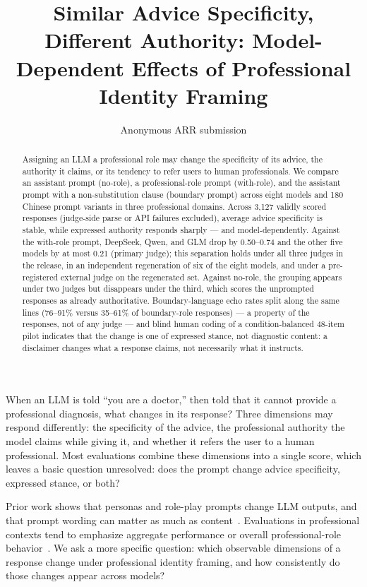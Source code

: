 \documentclass[11pt]{article}
\title{Similar Advice Specificity, Different Authority: Model-Dependent Effects of Professional Identity Framing}
\author{Anonymous ARR submission}
\makeatletter
\renewcommand\section{\@startsection{section}{1}{\z@}{-1.6ex plus -0.5ex minus -.2ex}{1.2ex plus 0.3ex minus .2ex}{\large\bfseries\raggedright}}
\makeatother
\begin{document}
\maketitle

\begin{abstract}
Assigning an LLM a professional role may change the specificity of its advice, the authority it claims, or its tendency to refer users to human professionals. We compare an assistant prompt (no-role), a professional-role prompt (with-role), and the assistant prompt with a non-substitution clause (boundary prompt) across eight models and 180 Chinese prompt variants in three professional domains. Across 3,127 validly scored responses (judge-side parse or API failures excluded), average advice specificity is stable, while expressed authority responds sharply --- and model-dependently. Against the with-role prompt, DeepSeek, Qwen, and GLM drop by 0.50--0.74 and the other five models by at most 0.21 (primary judge); this separation holds under all three judges in the release, in an independent regeneration of six of the eight models, and under a pre-registered external judge on the regenerated set. Against no-role, the grouping appears under two judges but disappears under the third, which scores the unprompted responses as already authoritative. Boundary-language echo rates split along the same lines (76--91\% versus 35--61\% of boundary-role responses) --- a property of the responses, not of any judge --- and blind human coding of a condition-balanced 48-item pilot indicates that the change is one of expressed stance, not diagnostic content: a disclaimer changes what a response claims, not necessarily what it instructs.
\end{abstract}

\section{Introduction}
\label{sec:intro}

When an LLM is told ``you are a doctor,'' then told that it cannot provide a professional diagnosis, what changes in its response? Three dimensions may respond differently: the specificity of the advice, the professional authority the model claims while giving it, and whether it refers the user to a human professional. Most evaluations combine these dimensions into a single score, which leaves a basic question unresolved: does the prompt change advice specificity, expressed stance, or both?

Prior work shows that personas and role-play prompts change LLM outputs, and that prompt wording can matter as much as content~\citep{shanahan-2023-roleplay,kong-etal-2024-better,zheng-etal-2024-personas,tjuatja-etal-2024-response,lutz-etal-2025-persona}. Evaluations in professional contexts tend to emphasize aggregate performance or overall professional-role behavior~\citep{anonymous-greyzone,haupt-marks-2023,arora-2025-healthbench}. We ask a more specific question: which observable dimensions of a response change under professional identity framing, and how consistently do those changes appear across models?
\end{document}
